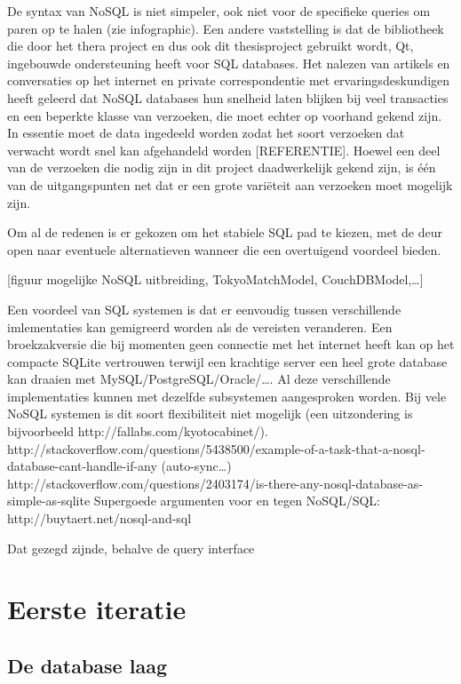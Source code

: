 De syntax van NoSQL is niet simpeler, ook niet voor de specifieke queries om paren op te halen (zie infographic). Een andere vaststelling is dat de bibliotheek die door het thera project en dus ook dit thesisproject gebruikt wordt, Qt, ingebouwde ondersteuning heeft voor SQL databases. Het nalezen van artikels en conversaties op het internet en private correspondentie met ervaringsdeskundigen heeft geleerd dat NoSQL databases hun snelheid laten blijken bij veel transacties en een beperkte klasse van verzoeken, die moet echter op voorhand gekend zijn\cite{cassandradatamodel}. In essentie moet de data ingedeeld worden zodat het soort verzoeken dat verwacht wordt snel kan afgehandeld worden [REFERENTIE]. Hoewel een deel van de verzoeken die nodig zijn in dit project daadwerkelijk gekend zijn, is \'e\'en van de uitgangspunten net dat er een grote vari\"eteit aan verzoeken moet mogelijk zijn.  

Om al de redenen is er gekozen om het stabiele SQL pad te kiezen, met de deur open naar eventuele alternatieven wanneer die een overtuigend voordeel bieden.

[figuur mogelijke NoSQL uitbreiding, TokyoMatchModel, CouchDBModel,\ldots] 

Een voordeel van SQL systemen is dat er eenvoudig tussen verschillende imlementaties kan gemigreerd worden als de vereisten veranderen. Een broekzakversie die bij momenten geen connectie met het internet heeft kan op het compacte SQLite vertrouwen terwijl een krachtige server een heel grote database kan draaien met MySQL/PostgreSQL/Oracle/\ldots. Al deze verschillende implementaties kunnen met dezelfde subsystemen aangesproken worden. Bij vele NoSQL systemen is dit soort flexibiliteit niet mogelijk (een uitzondering is bijvoorbeeld http://fallabs.com/kyotocabinet/).\\

http://stackoverflow.com/questions/5438500/example-of-a-task-that-a-nosql-database-cant-handle-if-any (auto-sync\ldots)
http://stackoverflow.com/questions/2403174/is-there-any-nosql-database-as-simple-as-sqlite
Supergoede argumenten voor en tegen NoSQL/SQL: http://buytaert.net/nosql-and-sql

Dat gezegd zijnde, behalve de query interface

\section{Eerste iteratie}

\subsection{De database laag}

